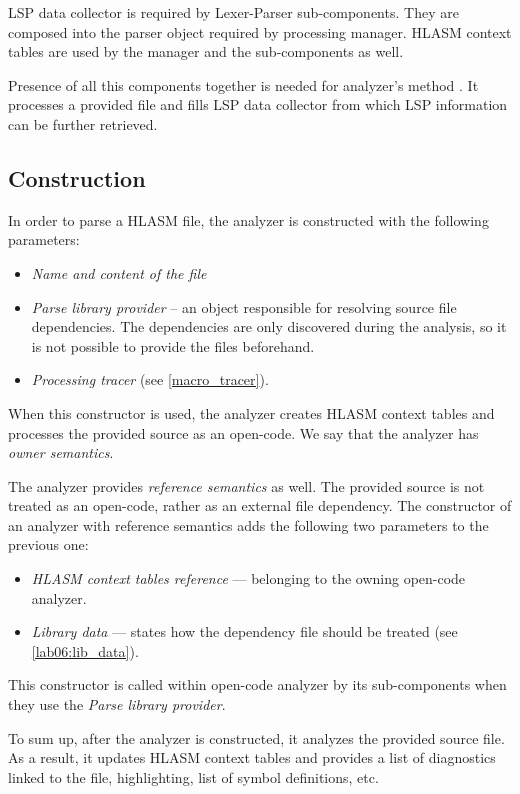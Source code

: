 LSP data collector is required by Lexer-Parser sub-components. They are composed into the parser object required by processing manager. HLASM context tables are used by the manager and the sub-components as well. 

Presence of all this components together is needed for analyzer's method . It processes a provided file and fills LSP data collector from which LSP information can be further retrieved.  

\subsection{Construction}

In order to parse a HLASM file, the analyzer is constructed with the following parameters:
\begin{itemize}
	\item \emph{Name and content of the file}
	\item \emph{Parse library provider} -- an object responsible for resolving source file dependencies. The dependencies are only discovered during the analysis, so it is not possible to provide the files beforehand.
	\item \emph{Processing tracer} (see \cref{macro_tracer}).
\end{itemize}

When this constructor is used, the analyzer creates HLASM context tables and processes the provided source as an open-code. We say that the analyzer has \emph{owner semantics}. 
 
The analyzer provides \emph{reference semantics} as well. The provided source is not treated as an open-code, rather as an external file dependency. The constructor of an analyzer with reference semantics adds the following two parameters to the previous one:
\begin{itemize}
	\item \emph{HLASM context tables reference} --- belonging to the owning open-code analyzer.
	\item \emph{Library data} --- states how the dependency file should be treated (see \cref{lab06:lib_data}).
\end{itemize}

This constructor is called within open-code analyzer by its sub-components when they use the \emph{Parse library provider}.

\vspace{0.5cm}

To sum up, after the analyzer is constructed, it analyzes the provided source file. As a result, it updates HLASM context tables and provides a list of diagnostics linked to the file, highlighting, list of symbol definitions, etc.


